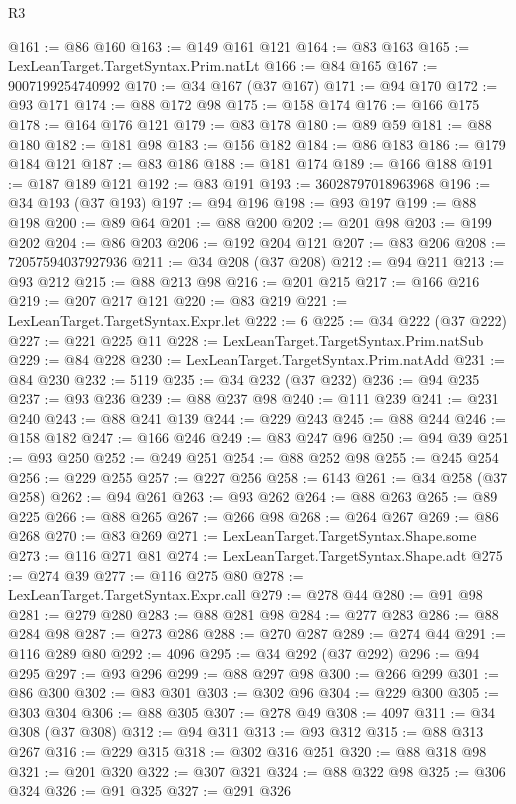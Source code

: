 \begin{lexlean}{R3}
\begin{coremodule}
@161 := @86 @160
@163 := @149 @161 @121
@164 := @83 @163
@165 := LexLeanTarget.TargetSyntax.Prim.natLt
@166 := @84 @165
@167 := 9007199254740992
@170 := @34 @167 (@37 @167)
@171 := @94 @170
@172 := @93 @171
@174 := @88 @172 @98
@175 := @158 @174
@176 := @166 @175
@178 := @164 @176 @121
@179 := @83 @178
@180 := @89 @59
@181 := @88 @180
@182 := @181 @98
@183 := @156 @182
@184 := @86 @183
@186 := @179 @184 @121
@187 := @83 @186
@188 := @181 @174
@189 := @166 @188
@191 := @187 @189 @121
@192 := @83 @191
@193 := 36028797018963968
@196 := @34 @193 (@37 @193)
@197 := @94 @196
@198 := @93 @197
@199 := @88 @198
@200 := @89 @64
@201 := @88 @200
@202 := @201 @98
@203 := @199 @202
@204 := @86 @203
@206 := @192 @204 @121
@207 := @83 @206
@208 := 72057594037927936
@211 := @34 @208 (@37 @208)
@212 := @94 @211
@213 := @93 @212
@215 := @88 @213 @98
@216 := @201 @215
@217 := @166 @216
@219 := @207 @217 @121
@220 := @83 @219
@221 := LexLeanTarget.TargetSyntax.Expr.let
@222 := 6
@225 := @34 @222 (@37 @222)
@227 := @221 @225 @11
@228 := LexLeanTarget.TargetSyntax.Prim.natSub
@229 := @84 @228
@230 := LexLeanTarget.TargetSyntax.Prim.natAdd
@231 := @84 @230
@232 := 5119
@235 := @34 @232 (@37 @232)
@236 := @94 @235
@237 := @93 @236
@239 := @88 @237 @98
@240 := @111 @239
@241 := @231 @240
@243 := @88 @241 @139
@244 := @229 @243
@245 := @88 @244
@246 := @158 @182
@247 := @166 @246
@249 := @83 @247 @96
@250 := @94 @39
@251 := @93 @250
@252 := @249 @251
@254 := @88 @252 @98
@255 := @245 @254
@256 := @229 @255
@257 := @227 @256
@258 := 6143
@261 := @34 @258 (@37 @258)
@262 := @94 @261
@263 := @93 @262
@264 := @88 @263
@265 := @89 @225
@266 := @88 @265
@267 := @266 @98
@268 := @264 @267
@269 := @86 @268
@270 := @83 @269
@271 := LexLeanTarget.TargetSyntax.Shape.some
@273 := @116 @271 @81
@274 := LexLeanTarget.TargetSyntax.Shape.adt
@275 := @274 @39
@277 := @116 @275 @80
@278 := LexLeanTarget.TargetSyntax.Expr.call
@279 := @278 @44
@280 := @91 @98
@281 := @279 @280
@283 := @88 @281 @98
@284 := @277 @283
@286 := @88 @284 @98
@287 := @273 @286
@288 := @270 @287
@289 := @274 @44
@291 := @116 @289 @80
@292 := 4096
@295 := @34 @292 (@37 @292)
@296 := @94 @295
@297 := @93 @296
@299 := @88 @297 @98
@300 := @266 @299
@301 := @86 @300
@302 := @83 @301
@303 := @302 @96
@304 := @229 @300
@305 := @303 @304
@306 := @88 @305
@307 := @278 @49
@308 := 4097
@311 := @34 @308 (@37 @308)
@312 := @94 @311
@313 := @93 @312
@315 := @88 @313 @267
@316 := @229 @315
@318 := @302 @316 @251
@320 := @88 @318 @98
@321 := @201 @320
@322 := @307 @321
@324 := @88 @322 @98
@325 := @306 @324
@326 := @91 @325
@327 := @291 @326

\end{coremodule}
\end{lexlean}
